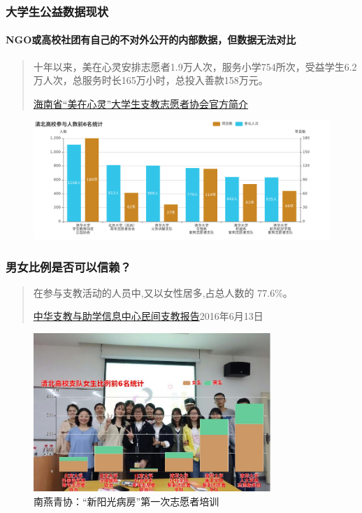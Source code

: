 \documentclass{ctexbeamer}
\begin{document}
\begin{frame}
\frametitle{大学生公益数据现状}
\framesubtitle{NGO或高校社团有自己的不对外公开的内部数据，但数据无法对比}
\begin{quote}
十年以来，美在心灵安排志愿者1.9万人次，服务小学754所次，受益学生6.2万人次，总服务时长165万小时，总投入善款158万元。
\begin{flushright}
\href{http://mp.weixin.qq.com/s/6gOQS-SN3P4PHH27FCMFTQ}{海南省“美在心灵”大学生支教志愿者协会官方简介}
\end{flushright}
\end{quote}
\begin{figure}
\includegraphics[width=\textwidth]{student3.png}
\end{figure}
\end{frame}
\begin{frame}
\frametitle{男女比例是否可以信赖？}
\begin{quote}
在参与支教活动的人员中,又以女性居多,占总人数的 77.6\%。
\vspace{-0.1cm}
\begin{flushright}
{\small\href{http://www.cta613.org/thread-9282-1-1.html}{中华支教与助学信息中心民间支教报告}2016年6月13日}
\end{flushright}
\end{quote}
\vspace{-0.45cm}
\begin{figure}
\includegraphics[width=0.8\textwidth]{all.jpg}
\caption{南燕青协：“新阳光病房”第一次志愿者培训}
\end{figure}
\end{frame}
\end{document}
